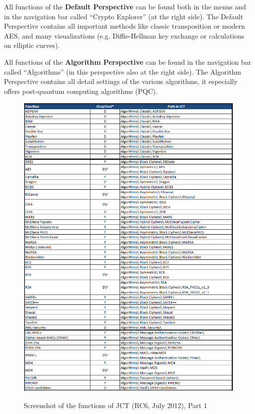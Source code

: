 All functions of the {\bf Default Perspective} can be found both in the menus and
in the navigation bar called ``Crypto Explorer'' (at the right side).
The Default Perspective contains all important methods like classic transposition
or modern AES, and many visualizations (e.g. Diffie-Hellman key exchange or
calculations on elliptic curves).

All functions of the {\bf Algorithm Perspective} can be found in the navigation bar
called ``Algorithms'' (in this perspective also at the right side).
The Algorithm Perspective contains all detail settings of the various algorithms, it
especially offers post-quantum computing algorithms (PQC).

\clearpage
\begin{figure}[hb]
\begin{center}
\vspace{-30pt}
\includegraphics[scale=0.8, angle=0] {figures/JCT-functions-en-1}
\hypertarget{functions-overview-1-JCT}{}
\caption{Screenshot of the functions of JCT (RC6, July 2012), Part 1} 
\label{functions-overview-1-JCT}
\end{center}
\end{figure}
\clearpage

